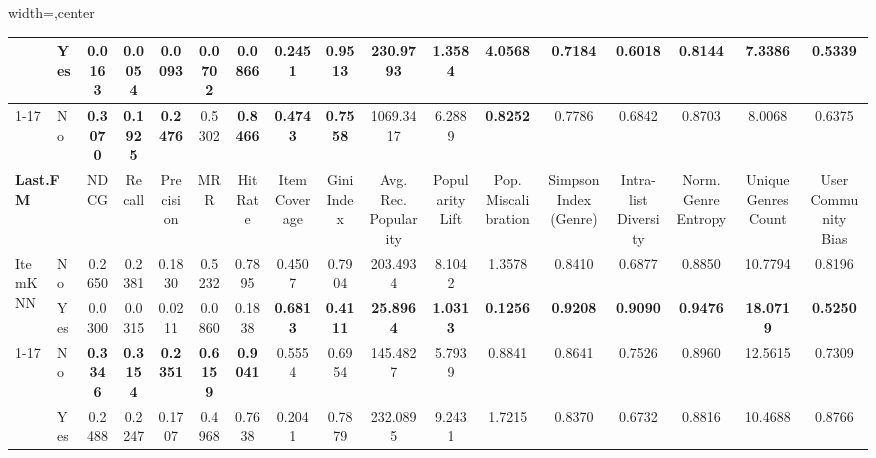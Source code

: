 \begin{table}[htbp]
\begin{adjustbox}{width=\textwidth,center}
\begin{tabular}{llccccccccccccccc}
 & Yes & \cellcolor{red!40} 0.0163 & \cellcolor{red!40} 0.0054 & \cellcolor{red!40} 0.0093 & \cellcolor{red!40} 0.0702 & \cellcolor{red!40} 0.0866 & \cellcolor{red!40} 0.2451 & \cellcolor{red!40} 0.9513 & \textbf{\cellcolor{green!40} 230.9793} & \textbf{\cellcolor{green!40} 1.3584} & \cellcolor{red!40} 4.0568 & \cellcolor{red!40} 0.7184 & \cellcolor{red!40} 0.6018 & \cellcolor{red!40} 0.8144 & \cellcolor{red!40} 7.3386 & \textbf{\cellcolor{green!40} 0.5339} \\
\cmidrule{1-17}
\multirow{2}{*}{LightGCN} & No & \textbf{0.3070} & \textbf{0.1925} & \textbf{0.2476} & 0.5302 & \textbf{0.8466} & \textbf{0.4743} & \textbf{0.7558} & 1069.3417 & 6.2889 & \textbf{0.8252} & 0.7786 & 0.6842 & 0.8703 & 8.0068 & 0.6375 \\
\midrule\midrule
\multicolumn{2}{l}{\textbf{Last.FM}} & NDCG & Recall & Precision & MRR & Hit Rate & Item Coverage & Gini Index & Avg. Rec. Popularity & Popularity Lift & Pop. Miscalibration & Simpson Index (Genre) & Intra-list Diversity & Norm. Genre Entropy & Unique Genres Count & User Community Bias \\
\midrule
\multirow{2}{*}{ItemKNN} & No & 0.2650 & 0.2381 & 0.1830 & 0.5232 & 0.7895 & 0.4507 & 0.7904 & 203.4934 & 8.1042 & 1.3578 & 0.8410 & 0.6877 & 0.8850 & 10.7794 & 0.8196 \\
 & Yes & \cellcolor{red!40} 0.0300 & \cellcolor{red!40} 0.0315 & \cellcolor{red!40} 0.0211 & \cellcolor{red!40} 0.0860 & \cellcolor{red!40} 0.1838 & \textbf{\cellcolor{green!40} 0.6813} & \textbf{\cellcolor{green!40} 0.4111} & \textbf{\cellcolor{green!40} 25.8964} & \textbf{\cellcolor{green!40} 1.0313} & \textbf{\cellcolor{green!40} 0.1256} & \textbf{\cellcolor{green!40} 0.9208} & \textbf{\cellcolor{green!40} 0.9090} & \textbf{\cellcolor{green!40} 0.9476} & \textbf{\cellcolor{green!40} 18.0719} & \textbf{\cellcolor{green!40} 0.5250} \\
\cmidrule{1-17}
\multirow{2}{*}{LightGCN} & No & \textbf{0.3346} & \textbf{0.3154} & \textbf{0.2351} & \textbf{0.6159} & \textbf{0.9041} & 0.5554 & 0.6954 & 145.4827 & 5.7939 & 0.8841 & 0.8641 & 0.7526 & 0.8960 & 12.5615 & 0.7309 \\
 & Yes & \cellcolor{red!40} 0.2488 & \cellcolor{red!40} 0.2247 & \cellcolor{red!40} 0.1707 & \cellcolor{red!40} 0.4968 & \cellcolor{red!40} 0.7638 & \cellcolor{red!40} 0.2041 & \cellcolor{red!40} 0.7879 & \cellcolor{red!40} 232.0895 & \cellcolor{red!40} 9.2431 & \cellcolor{red!40} 1.7215 & \cellcolor{red!20} 0.8370 & \cellcolor{red!40} 0.6732 & \cellcolor{red!20} 0.8816 & \cellcolor{red!40} 10.4688 & \cellcolor{red!40} 0.8766 \\
\bottomrule
\end{tabular}
\end{adjustbox}
\end{table}